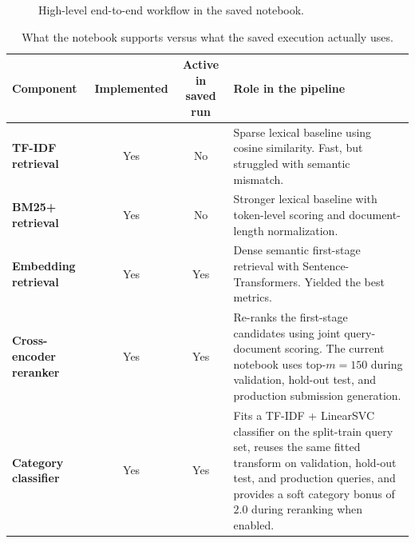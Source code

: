 \documentclass[11pt,a4paper]{article}
\begin{document}
\begin{figure}[H]
\centering
{}
\caption{High-level end-to-end workflow in the saved notebook.}
\end{figure}

\begin{table}[H]
\centering
\small
\begin{tabularx}{\linewidth}{>{\bfseries}l c c Y}
\toprule
Component & Implemented & Active in saved run & Role in the pipeline \\
\midrule
TF-IDF retrieval & Yes & No & Sparse lexical baseline using cosine similarity. Fast, but struggled with semantic mismatch. \\
BM25+ retrieval & Yes & No & Stronger lexical baseline with token-level scoring and document-length normalization. \\
Embedding retrieval & Yes & Yes & Dense semantic first-stage retrieval with Sentence-Transformers. Yielded the best metrics. \\
Cross-encoder reranker & Yes & Yes & Re-ranks the first-stage candidates using joint query-document scoring. The current notebook uses top-\(m=150\) during validation, hold-out test, and production submission generation. \\
Category classifier & Yes & Yes & Fits a TF-IDF + LinearSVC classifier on the split-train query set, reuses the same fitted transform on validation, hold-out test, and production queries, and provides a soft category bonus of \(2.0\) during reranking when enabled. \\
\bottomrule
\end{tabularx}
\caption{What the notebook supports versus what the saved execution actually uses.}
\end{table}
\end{document}
